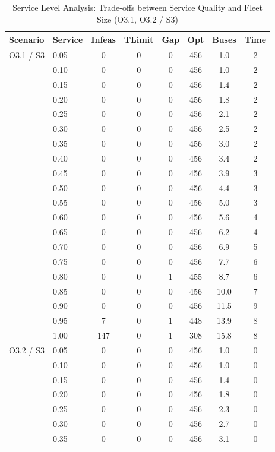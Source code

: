 \begin{table}[ht]
\centering
\caption{Service Level Analysis: Trade-offs between Service Quality and Fleet Size (O3.1, O3.2 / S3)}
\label{tab:service_level_analysis}
\begin{threeparttable}
\begin{tabular}{llcccccc}
\toprule
Scenario & Service & Infeas & TLimit & Gap & Opt & Buses & Time \\
\midrule
O3.1 / S3 & 0.05 & 0 & 0 & 0 & 456 & 1.0 & 2 \\
 & 0.10 & 0 & 0 & 0 & 456 & 1.0 & 2 \\
 & 0.15 & 0 & 0 & 0 & 456 & 1.4 & 2 \\
 & 0.20 & 0 & 0 & 0 & 456 & 1.8 & 2 \\
 & 0.25 & 0 & 0 & 0 & 456 & 2.1 & 2 \\
 & 0.30 & 0 & 0 & 0 & 456 & 2.5 & 2 \\
 & 0.35 & 0 & 0 & 0 & 456 & 3.0 & 2 \\
 & 0.40 & 0 & 0 & 0 & 456 & 3.4 & 2 \\
 & 0.45 & 0 & 0 & 0 & 456 & 3.9 & 3 \\
 & 0.50 & 0 & 0 & 0 & 456 & 4.4 & 3 \\
 & 0.55 & 0 & 0 & 0 & 456 & 5.0 & 3 \\
 & 0.60 & 0 & 0 & 0 & 456 & 5.6 & 4 \\
 & 0.65 & 0 & 0 & 0 & 456 & 6.2 & 4 \\
 & 0.70 & 0 & 0 & 0 & 456 & 6.9 & 5 \\
 & 0.75 & 0 & 0 & 0 & 456 & 7.7 & 6 \\
 & 0.80 & 0 & 0 & 1 & 455 & 8.7 & 6 \\
 & 0.85 & 0 & 0 & 0 & 456 & 10.0 & 7 \\
 & 0.90 & 0 & 0 & 0 & 456 & 11.5 & 9 \\
 & 0.95 & 7 & 0 & 1 & 448 & 13.9 & 8 \\
 & 1.00 & 147 & 0 & 1 & 308 & 15.8 & 8 \\
\midrule
O3.2 / S3 & 0.05 & 0 & 0 & 0 & 456 & 1.0 & 0 \\
 & 0.10 & 0 & 0 & 0 & 456 & 1.0 & 0 \\
 & 0.15 & 0 & 0 & 0 & 456 & 1.4 & 0 \\
 & 0.20 & 0 & 0 & 0 & 456 & 1.8 & 0 \\
 & 0.25 & 0 & 0 & 0 & 456 & 2.3 & 0 \\
 & 0.30 & 0 & 0 & 0 & 456 & 2.7 & 0 \\
 & 0.35 & 0 & 0 & 0 & 456 & 3.1 & 0 \\

\end{tabular}
\end{threeparttable}
\end{table}
